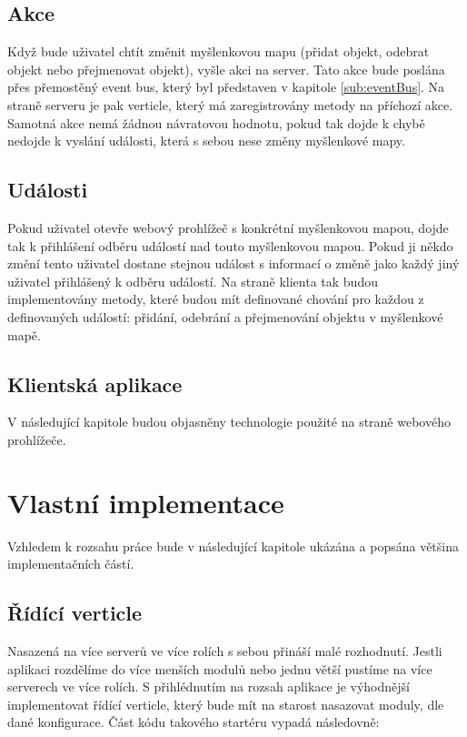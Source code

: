 \subsection{Akce}

Když bude uživatel chtít změnit myšlenkovou mapu (přidat objekt, odebrat objekt nebo přejmenovat objekt), vyšle akci na server. Tato akce bude poslána přes přemostěný event bus, který byl představen v kapitole \ref{sub:eventBus}. Na straně serveru je pak verticle, který má zaregistrovány metody na příchozí akce. Samotná akce nemá žádnou návratovou hodnotu, pokud tak dojde k chybě nedojde k vyslání události, která s sebou nese změny myšlenkové mapy.

\subsection{Události}

Pokud uživatel otevře webový prohlížeč s konkrétní myšlenkovou mapou, dojde tak k přihlášení odběru událostí nad touto myšlenkovou mapou. Pokud ji někdo změní tento uživatel dostane stejnou událost s informací o změně jako každý jiný uživatel přihlášený k odběru událostí.
Na straně klienta tak budou implementovány metody, které budou mít definované chování pro každou z definovaných událostí: přidání, odebrání a přejmenování objektu v myšlenkové mapě.

\subsection{Klientská aplikace}

V následující kapitole budou objasněny technologie použité na straně webového prohlížeče.


\section{Vlastní implementace}

Vzhledem k rozsahu práce bude v následující kapitole ukázána a popsána většina implementačních částí.

\subsection{Řídící verticle}

Nasazená na více serverů ve více rolích s sebou přináší malé rozhodnutí. Jestli aplikaci rozdělíme do více menších modulů nebo jednu větší pustíme na více serverech ve více rolích. S přihlédnutím na rozsah aplikace je výhodnější implementovat řídící verticle, který bude mít na starost nasazovat moduly, dle dané konfigurace. Část kódu takového startéru vypadá následovně:

